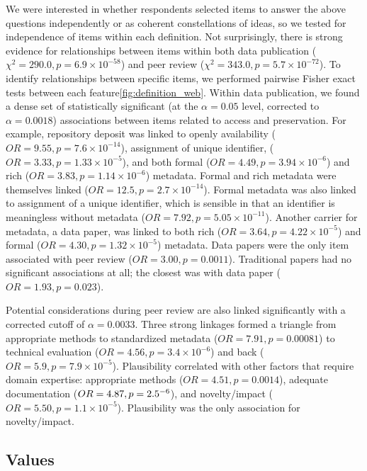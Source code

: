 \documentclass[10pt]{article}
\begin{document}
We were interested in whether respondents selected items to answer the above questions independently or as coherent constellations of ideas, so we tested for independence of items within each definition. 
Not surprisingly, there is strong evidence for relationships between items within both data publication ($\chi^{2}=290.0, p=6.9\times10^{-58}$) and peer review ($\chi^{2}= 343.0, p= 5.7\times10^{-72}$).
To identify relationships between specific items, we performed pairwise Fisher exact tests between each feature\ref{fig:definition_web}.
Within data publication, we found a dense set of statistically significant (at the $\alpha=0.05$ level, corrected to $\alpha=0.0018$) associations between items related to access and preservation.
For example, repository deposit was linked to openly availability ($OR=9.55, p=7.6\times10^{-14}$), assignment of unique identifier, ($OR= 3.33, p= 1.33\times10^{-5}$), and both formal ($OR= 4.49, p= 3.94\times10^{-6}$) and rich ($OR= 3.83, p=1.14\times10^{-6}$) metadata.
Formal and rich metadata were themselves linked ($OR= 12.5, p=2.7\times10^{-14}$). 
Formal metadata was also linked to assignment of a unique identifier, which is sensible in that an identifier is meaningless without metadata ($OR= 7.92, p= 5.05\times10^{-11}$).
Another carrier for metadata, a data paper, was linked to both rich ($OR=3.64, p=4.22\times10^{-5}$) and formal ($OR=4.30, p=1.32\times10^{-5}$) metadata.
Data papers were the only item associated with peer review ($OR=3.00, p=0.0011$).
Traditional papers had no significant associations at all; the closest was with data paper ($OR=1.93, p=0.023$).

Potential considerations during peer review are also linked significantly with a corrected cutoff of $\alpha=0.0033$.
Three strong linkages formed a triangle from appropriate methods to standardized metadata ($OR=7.91, p=0.00081$) to technical evaluation ($OR=4.56, p=3.4\times10^{-6}$) and back ($OR=5.9, p=7.9\times10^{-5}$).
Plausibility correlated with other factors that require domain expertise: appropriate methods ($OR=4.51, p=0.0014$), adequate documentation ($OR=4.87, p=2.5\time10^{-6}$), and novelty/impact ($OR=5.50, p=1.1\times10^{-5}$).
Plausibility was the only association for novelty/impact.

\subsection*{Values}
\end{document}
